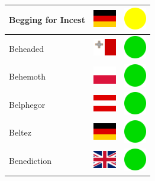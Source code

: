 \documentclass[12pt, a4paper, twoside]{report}
\begin{document}
\begin{center}
\begin{longtable}{|p{5cm}|p{2cm}|p{2cm}|}
Begging for Incest & \includegraphics[width=1cm]{4x3/de} & \includegraphics[width=1cm]{likes/m} \\ \hline
Beheaded & \includegraphics[width=1cm]{4x3/mt} & \includegraphics[width=1cm]{likes/y} \\ \hline
Behemoth & \includegraphics[width=1cm]{4x3/pl} & \includegraphics[width=1cm]{likes/y} \\ \hline
Belphegor & \includegraphics[width=1cm]{4x3/at} & \includegraphics[width=1cm]{likes/y} \\ \hline
Beltez & \includegraphics[width=1cm]{4x3/de} & \includegraphics[width=1cm]{likes/y} \\ \hline
Benediction & \includegraphics[width=1cm]{4x3/gb} & \includegraphics[width=1cm]{likes/y} \\ \hline

\end{longtable}
\end{center}
\end{document}
